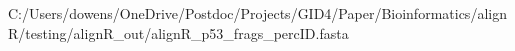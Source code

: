 \documentclass[preview]{standalone}
\begin{document}
\begin{texshade}{C:/Users/dowens/OneDrive/Postdoc/Projects/GID4/Paper/Bioinformatics/alignR/testing/alignR_out/alignR_p53_frags_percID.fasta}
\showlegend
\movelegend{0cm}{0cm}
\namesfootnotesize
\residuesfootnotesize
\legendfootnotesize
\numberingtiny
\end{texshade}
\end{document}
